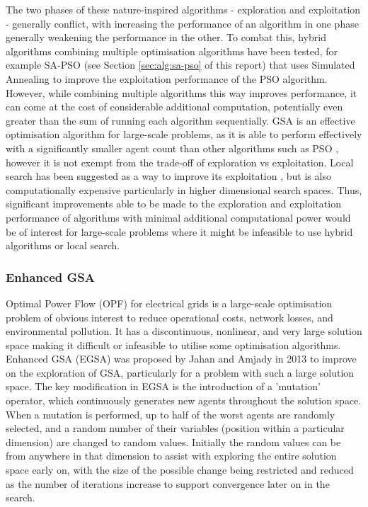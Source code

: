 The two phases of these nature-inspired algorithms - exploration and exploitation - generally conflict, with increasing the performance of an algorithm in one phase generally weakening the performance in the other.
To combat this, hybrid algorithms combining multiple optimisation algorithms have been tested, for example SA-PSO (see Section \ref{sec:alg:sa-pso} of this report) that uses Simulated Annealing to improve the exploitation performance of the PSO algorithm.
However, while combining multiple algorithms this way improves performance, it can come at the cost of considerable additional computation, potentially even greater than the sum of running each algorithm sequentially.
GSA is an effective optimisation algorithm for large-scale problems, as it is able to perform effectively with a significantly smaller agent count than other algorithms such as PSO \cite{EGSA}, however it is not exempt from the trade-off of exploration vs exploitation.
Local search has been suggested as a way to improve its exploitation \cite{GSA}, but is also computationally expensive particularly in higher dimensional search spaces.
Thus, significant improvements able to be made to the exploration and exploitation performance of algorithms with minimal additional computational power would be of interest for large-scale problems where it might be infeasible to use hybrid algorithms or local search.


\subsubsection{Enhanced GSA}\label{sec:alg:gsa:egsa}
Optimal Power Flow (OPF) for electrical grids is a large-scale optimisation problem of obvious interest to reduce operational costs, network losses, and environmental pollution.
It has a discontinuous, nonlinear, and very large solution space making it difficult or infeasible to utilise some optimisation algorithms.
Enhanced GSA (EGSA) was proposed by Jahan and Amjady \cite{EGSA} in 2013 to improve on the exploration of GSA, particularly for a problem with such a large solution space.
The key modification in EGSA is the introduction of a 'mutation' operator, which continuously generates new agents throughout the solution space.
When a mutation is performed, up to half of the worst agents are randomly selected, and a random number of their variables (position within a particular dimension) are changed to random values.
Initially the random values can be from anywhere in that dimension to assist with exploring the entire solution space early on, with the size of the possible change being restricted and reduced as the number of iterations increase to support convergence later on in the search.

